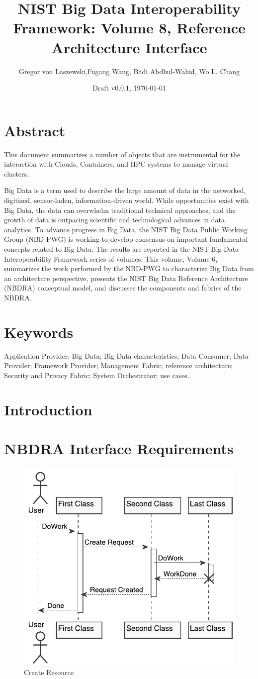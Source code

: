 \documentclass[10pt]{article}
\title{NIST Big Data Interoperability Framework: Volume 8, Reference Architecture Interface}
\author{Gregor von Laszewski,Fugang Wang, Badi Abdhul-Wahid, Wo L. Chang}
\date{Draft v0.0.1, \today}
\newcommand{\ABSTRACT}{
This document summarizes a number of objects that are instrumental for
the interaction with Clouds, Containers, and HPC systems to manage
virtual clusters. 

Big Data is a term used to describe the large amount of data in the
networked, digitized, sensor-laden, information-driven world. While
opportunities exist with Big Data, the data can overwhelm traditional
technical approaches, and the growth of data is outpacing scientific
and technological advances in data analytics. To advance progress in
Big Data, the NIST Big Data Public Working Group (NBD-PWG) is working
to develop consensus on important fundamental concepts related to Big
Data. The results are reported in the NIST Big Data Interoperability
Framework series of volumes. This volume, Volume 6, summarizes the
work performed by the NBD-PWG to characterize Big Data from an
architecture perspective, presents the NIST Big Data Reference
Architecture (NBDRA) conceptual model, and discusses the components
and fabrics of the NBDRA.

}
\begin{document}
\flushbottom %

\maketitle %

\tableofcontents %
\maketitle


%

\section*{\hfil \hspace{4cm} Abstract \hfil}
\ABSTRACT

\section*{\hfil  \hspace{4cm} Keywords \hfil}
Application Provider; Big Data; Big Data characteristics; Data Consumer; Data Provider; Framework Provider; Management Fabric; reference architecture; Security and Privacy Fabric; System Orchestrator; use cases.

\cite{*}




\newpage

\linenumbers
\section{Introduction}


\section{NBDRA Interface Requirements}

\begin{figure}[htb]
\includegraphics[width=0.5\columnwidth]{uml/a.pdf}
\caption{Create Resource}\label{F:uml}
\end{figure}
\end{document}
